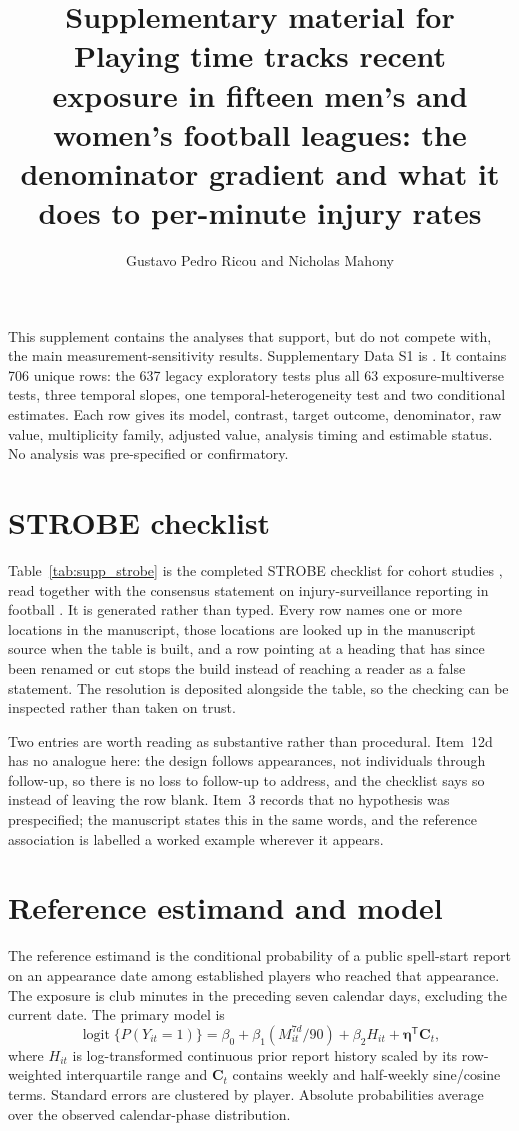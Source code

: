 \documentclass[11pt]{article}
\title{Supplementary material for\\
\large Playing time tracks recent exposure in fifteen men's and women's football leagues: the denominator gradient and what it does to per-minute injury rates}
\author{}
\author{Gustavo Pedro Ricou and Nicholas Mahony}
\date{}
\begin{document}
\ifdefined\journalreviewcopy
  \linenumbers
\fi
\maketitle

This supplement contains the analyses that support, but do not compete with, the main measurement-sensitivity results. Supplementary Data S1 is . It contains 706 unique rows: the 637 legacy exploratory tests plus all 63 exposure-multiverse tests, three temporal slopes, one temporal-heterogeneity test and two conditional estimates. Each row gives its model, contrast, target outcome, denominator, raw value, multiplicity family, adjusted value, analysis timing and estimable status. No analysis was pre-specified or confirmatory.

\section{STROBE checklist}

Table~\ref{tab:supp_strobe} is the completed STROBE checklist for cohort studies \cite{vonelm2007strobe}, read together with the consensus statement on injury-surveillance reporting in football \cite{bahr2020ioc}. It is generated rather than typed. Every row names one or more locations in the manuscript, those locations are looked up in the manuscript source when the table is built, and a row pointing at a heading that has since been renamed or cut stops the build instead of reaching a reader as a false statement. The resolution is deposited alongside the table, so the checking can be inspected rather than taken on trust.

Two entries are worth reading as substantive rather than procedural. Item~12d has no analogue here: the design follows appearances, not individuals through follow-up, so there is no loss to follow-up to address, and the checklist says so instead of leaving the row blank. Item~3 records that no hypothesis was prespecified; the manuscript states this in the same words, and the reference association is labelled a worked example wherever it appears.



\section{Reference estimand and model}

The reference estimand is the conditional probability of a public spell-start report on an appearance date among established players who reached that appearance. The exposure is club minutes in the preceding seven calendar days, excluding the current date. The primary model is
\[
\operatorname{logit}\{P(Y_{it}=1)\}=\beta_0+\beta_1(M_{it}^{7d}/90)
+\beta_2H_{it}+\boldsymbol{\eta}^{\mathsf T}\mathbf{C}_{t},
\]
where $H_{it}$ is log-transformed continuous prior report history scaled by its row-weighted interquartile range and $\mathbf{C}_{t}$ contains weekly and half-weekly sine/cosine terms. Standard errors are clustered by player. Absolute probabilities average over the observed calendar-phase distribution.
\end{document}
